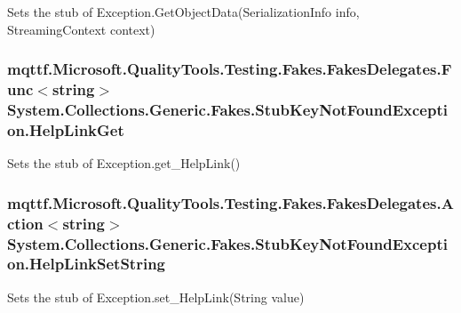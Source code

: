 Sets the stub of Exception.\-Get\-Object\-Data(\-Serialization\-Info info, Streaming\-Context context)

\hypertarget{class_system_1_1_collections_1_1_generic_1_1_fakes_1_1_stub_key_not_found_exception_addd20e8f71c2f4dd88636c8f4271b5c6}{
\subsubsection[{Help\-Link\-Get}]{\setlength{\rightskip}{0pt plus 5cm}mqttf.\-Microsoft.\-Quality\-Tools.\-Testing.\-Fakes.\-Fakes\-Delegates.\-Func$<$string$>$ System.\-Collections.\-Generic.\-Fakes.\-Stub\-Key\-Not\-Found\-Exception.\-Help\-Link\-Get}}\label{class_system_1_1_collections_1_1_generic_1_1_fakes_1_1_stub_key_not_found_exception_addd20e8f71c2f4dd88636c8f4271b5c6}


Sets the stub of Exception.\-get\-\_\-\-Help\-Link()

\hypertarget{class_system_1_1_collections_1_1_generic_1_1_fakes_1_1_stub_key_not_found_exception_aabbc12824db59720fffdc53e7a05b761}{
\subsubsection[{Help\-Link\-Set\-String}]{\setlength{\rightskip}{0pt plus 5cm}mqttf.\-Microsoft.\-Quality\-Tools.\-Testing.\-Fakes.\-Fakes\-Delegates.\-Action$<$string$>$ System.\-Collections.\-Generic.\-Fakes.\-Stub\-Key\-Not\-Found\-Exception.\-Help\-Link\-Set\-String}}\label{class_system_1_1_collections_1_1_generic_1_1_fakes_1_1_stub_key_not_found_exception_aabbc12824db59720fffdc53e7a05b761}


Sets the stub of Exception.\-set\-\_\-\-Help\-Link(\-String value)


